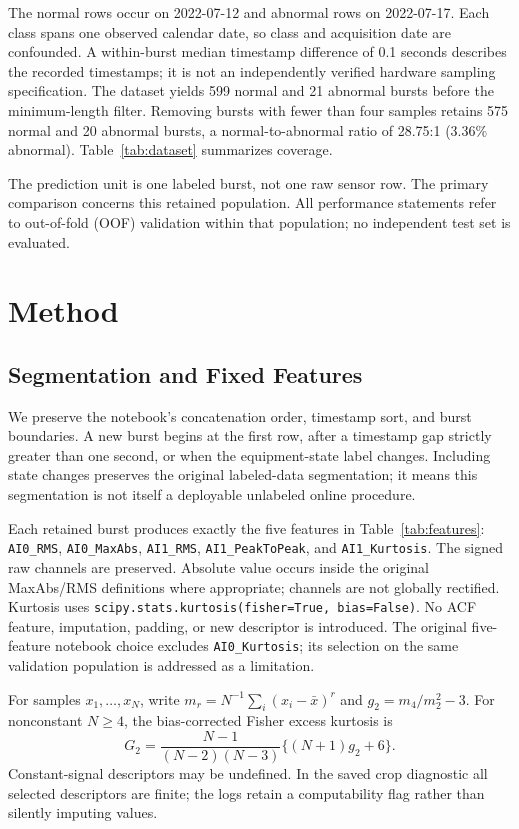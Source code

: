 \documentclass[10pt,twocolumn,letterpaper]{article}
\begin{document}
The normal rows occur on 2022-07-12 and abnormal rows on 2022-07-17. Each class spans one observed calendar date, so class and acquisition date are confounded. A within-burst median timestamp difference of 0.1 seconds describes the recorded timestamps; it is not an independently verified hardware sampling specification. The dataset yields 599 normal and 21 abnormal bursts before the minimum-length filter. Removing bursts with fewer than four samples retains 575 normal and 20 abnormal bursts, a normal-to-abnormal ratio of 28.75:1 (3.36\% abnormal). Table~\ref{tab:dataset} summarizes coverage.

The prediction unit is one labeled burst, not one raw sensor row. The primary comparison concerns this retained population. All performance statements refer to out-of-fold (OOF) validation within that population; no independent test set is evaluated.



\section{Method}
\subsection{Segmentation and Fixed Features}
We preserve the notebook's concatenation order, timestamp sort, and burst boundaries. A new burst begins at the first row, after a timestamp gap strictly greater than one second, or when the equipment-state label changes. Including state changes preserves the original labeled-data segmentation; it means this segmentation is not itself a deployable unlabeled online procedure.

Each retained burst produces exactly the five features in Table~\ref{tab:features}: \texttt{AI0\_RMS}, \texttt{AI0\_MaxAbs}, \texttt{AI1\_RMS}, \texttt{AI1\_PeakToPeak}, and \texttt{AI1\_Kurtosis}. The signed raw channels are preserved. Absolute value occurs inside the original MaxAbs/RMS definitions where appropriate; channels are not globally rectified. Kurtosis uses \texttt{scipy.stats.kurtosis(fisher=True, bias=False)}. No ACF feature, imputation, padding, or new descriptor is introduced. The original five-feature notebook choice excludes \texttt{AI0\_Kurtosis}; its selection on the same validation population is addressed as a limitation.

For samples $x_1,\ldots,x_N$, write $m_r=N^{-1}\sum_i(x_i-\bar{x})^r$ and $g_2=m_4/m_2^2-3$. For nonconstant $N\geq4$, the bias-corrected Fisher excess kurtosis is
\begin{equation}
G_2=\frac{N-1}{(N-2)(N-3)}\{(N+1)g_2+6\}.
\end{equation}
Constant-signal descriptors may be undefined. In the saved crop diagnostic all selected descriptors are finite; the logs retain a computability flag rather than silently imputing values.
\end{document}
